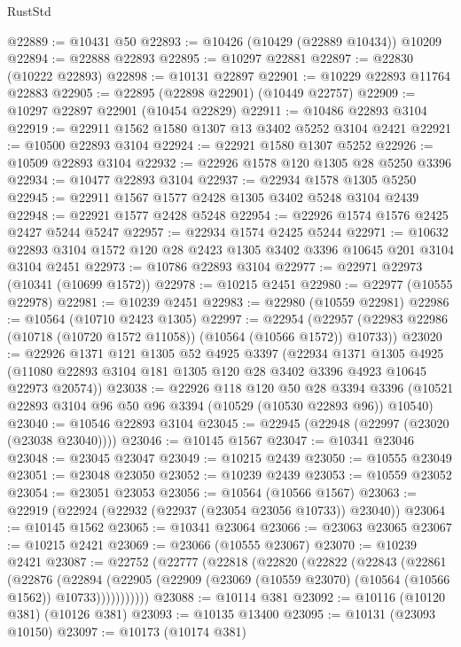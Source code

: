\begin{lexlean}{RustStd}
\begin{coremodule}
@22889 := @10431 @50
@22893 := @10426 (@10429 (@22889 @10434)) @10209
@22894 := @22888 @22893
@22895 := @10297 @22881
@22897 := @22830 (@10222 @22893)
@22898 := @10131 @22897
@22901 := @10229 @22893 @11764 @22883
@22905 := @22895 (@22898 @22901) (@10449 @22757)
@22909 := @10297 @22897 @22901 (@10454 @22829)
@22911 := @10486 @22893 @3104
@22919 := @22911 @1562 @1580 @1307 @13 @3402 @5252 @3104 @2421
@22921 := @10500 @22893 @3104
@22924 := @22921 @1580 @1307 @5252
@22926 := @10509 @22893 @3104
@22932 := @22926 @1578 @120 @1305 @28 @5250 @3396
@22934 := @10477 @22893 @3104
@22937 := @22934 @1578 @1305 @5250
@22945 := @22911 @1567 @1577 @2428 @1305 @3402 @5248 @3104 @2439
@22948 := @22921 @1577 @2428 @5248
@22954 := @22926 @1574 @1576 @2425 @2427 @5244 @5247
@22957 := @22934 @1574 @2425 @5244
@22971 := @10632 @22893 @3104 @1572 @120 @28 @2423 @1305 @3402 @3396 @10645 @201 @3104 @3104 @2451
@22973 := @10786 @22893 @3104
@22977 := @22971 @22973 (@10341 (@10699 @1572))
@22978 := @10215 @2451
@22980 := @22977 (@10555 @22978)
@22981 := @10239 @2451
@22983 := @22980 (@10559 @22981)
@22986 := @10564 (@10710 @2423 @1305)
@22997 := @22954
    (@22957 (@22983 @22986 (@10718 (@10720 @1572 @11058)) (@10564 (@10566 @1572)) @10733))
@23020 := @22926
    @1371
    @121
    @1305
    @52
    @4925
    @3397
    (@22934
      @1371
      @1305
      @4925
      (@11080 @22893 @3104 @181 @1305 @120 @28 @3402 @3396 @4923 @10645 @22973 @20574))
@23038 := @22926
    @118
    @120
    @50
    @28
    @3394
    @3396
    (@10521 @22893 @3104 @96 @50 @96 @3394 (@10529 (@10530 @22893 @96)) @10540)
@23040 := @10546 @22893 @3104
@23045 := @22945 (@22948 (@22997 (@23020 (@23038 @23040))))
@23046 := @10145 @1567
@23047 := @10341 @23046
@23048 := @23045 @23047
@23049 := @10215 @2439
@23050 := @10555 @23049
@23051 := @23048 @23050
@23052 := @10239 @2439
@23053 := @10559 @23052
@23054 := @23051 @23053
@23056 := @10564 (@10566 @1567)
@23063 := @22919 (@22924 (@22932 (@22937 (@23054 @23056 @10733)) @23040))
@23064 := @10145 @1562
@23065 := @10341 @23064
@23066 := @23063 @23065
@23067 := @10215 @2421
@23069 := @23066 (@10555 @23067)
@23070 := @10239 @2421
@23087 := @22752
    (@22777
      (@22818
        (@22820
          (@22822
            (@22843
              (@22861
                (@22876
                  (@22894
                    (@22905
                      (@22909 (@23069 (@10559 @23070) (@10564 (@10566 @1562)) @10733)))))))))))
@23088 := @10114 @381
@23092 := @10116 (@10120 @381) (@10126 @381)
@23093 := @10135 @13400
@23095 := @10131 (@23093 @10150)
@23097 := @10173 (@10174 @381)

\end{coremodule}
\end{lexlean}
